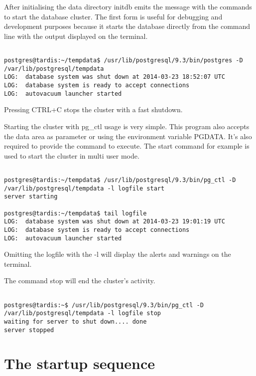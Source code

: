 After initialising the data directory initdb emits the message with the
commands to start the database cluster. The first form is useful for debugging
and development purposes because it starts the database directly from the
command line with the output displayed on the terminal.

\begin{verbatim}

postgres@tardis:~/tempdata$ /usr/lib/postgresql/9.3/bin/postgres -D
/var/lib/postgresql/tempdata
LOG:  database system was shut down at 2014-03-23 18:52:07 UTC
LOG:  database system is ready to accept connections
LOG:  autovacuum launcher started

\end{verbatim}

Pressing CTRL+C stops the cluster with a fast shutdown.\newline

Starting the cluster with pg\_ctl usage is very simple. This program also
accepts the data area as parameter or using the environment variable PGDATA.
It's also required to provide the command to execute. The start command for
example is used to start the cluster in multi user mode.

\begin{verbatim}

postgres@tardis:~/tempdata$ /usr/lib/postgresql/9.3/bin/pg_ctl -D
/var/lib/postgresql/tempdata -l logfile start
server starting

postgres@tardis:~/tempdata$ tail logfile
LOG:  database system was shut down at 2014-03-23 19:01:19 UTC
LOG:  database system is ready to accept connections
LOG:  autovacuum launcher started

\end{verbatim}

Omitting the logfile with the -l will display the alerts and warnings on the
terminal.

The command stop will end the cluster's activity.

\begin{verbatim}

postgres@tardis:~$ /usr/lib/postgresql/9.3/bin/pg_ctl -D
/var/lib/postgresql/tempdata -l logfile stop
waiting for server to shut down.... done
server stopped

\end{verbatim}

\section{The startup sequence}

